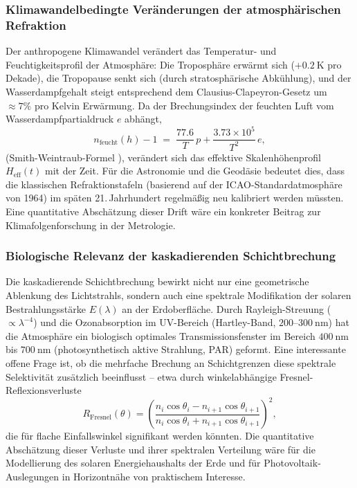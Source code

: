 ﻿\documentclass[12pt,a4paper]{article}
\begin{document}
\subsubsection{Klimawandelbedingte Veränderungen der atmosphärischen Refraktion}

Der anthropogene Klimawandel verändert das Temperatur- und
Feuchtigkeitsprofil der Atmosphäre:
Die Troposphäre erwärmt sich ($+\SI{0.2}{\kelvin}$ pro Dekade),
die Tropopause senkt sich (durch stratosphärische Abkühlung),
und der Wasserdampfgehalt steigt entsprechend dem
Clausius-Clapeyron-Gesetz um $\approx 7\%$ pro Kelvin
Erwärmung.
Da der Brechungsindex der feuchten Luft vom Wasserdampfpartialdruck $e$
abhängt,
\begin{equation}
  n_{\mathrm{feucht}}(h) - 1
  \;=\; \frac{77.6}{T}\,p + \frac{3.73\times10^5}{T^2}\,e,
  \label{eq:n_feucht}
\end{equation}
(Smith-Weintraub-Formel \citep{SmithWeintraub1953}),
verändert sich das effektive Skalenhöhenprofil $H_{\mathrm{eff}}(t)$
mit der Zeit.
Für die Astronomie und die Geodäsie bedeutet dies, dass die
klassischen Refraktionstafeln (basierend auf der
ICAO-Standardatmosphäre von 1964) im späten 21.\,Jahrhundert
regelmäßig neu kalibriert werden müssten.
Eine quantitative Abschätzung dieser Drift wäre ein konkreter
Beitrag zur Klimafolgenforschung in der Metrologie.

\subsubsection{Biologische Relevanz der kaskadierenden Schichtbrechung}

Die kaskadierende Schichtbrechung bewirkt nicht nur eine geometrische
Ablenkung des Lichtstrahls, sondern auch eine spektrale Modifikation
der solaren Bestrahlungsstärke $E(\lambda)$ an der Erdoberfläche.
Durch Rayleigh-Streuung ($ \propto \lambda^{-4}$) und die Ozonabsorption
im UV-Bereich (Hartley-Band, $200\text{--}\SI{300}{\nano\metre}$)
hat die Atmosphäre ein biologisch optimales Transmissionsfenster
im Bereich $\SI{400}{\nano\metre}$ bis $\SI{700}{\nano\metre}$
(photosynthetisch aktive Strahlung, PAR) geformt.
Eine interessante offene Frage ist, ob die mehrfache Brechung an
Schichtgrenzen diese spektrale Selektivität zusätzlich beeinflusst --
etwa durch winkelabhängige Fresnel-Reflexionsverluste
\begin{equation}
  R_{\mathrm{Fresnel}}(\theta) =
  \left(\frac{n_i \cos\theta_i - n_{i+1}\cos\theta_{i+1}}
             {n_i \cos\theta_i + n_{i+1}\cos\theta_{i+1}}\right)^2,
  \label{eq:fresnel}
\end{equation}
die für flache Einfallswinkel signifikant werden könnten.
Die quantitative Abschätzung dieser Verluste und ihrer spektralen
Verteilung wäre für die Modellierung des solaren Energiehaushalts
der Erde und für Photovoltaik-Auslegungen in Horizontnähe von
praktischem Interesse.
\end{document}
